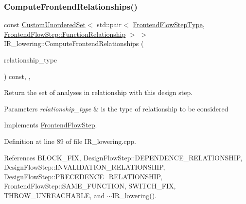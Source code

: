 \subsubsection{\texorpdfstring{Compute\+Frontend\+Relationships()}{ComputeFrontendRelationships()}}
{\footnotesize\ttfamily const \hyperlink{classCustomUnorderedSet}{Custom\+Unordered\+Set}$<$ std\+::pair$<$ \hyperlink{frontend__flow__step_8hpp_afeb3716c693d2b2e4ed3e6d04c3b63bb}{Frontend\+Flow\+Step\+Type}, \hyperlink{classFrontendFlowStep_af7cf30f2023e5b99e637dc2058289ab0}{Frontend\+Flow\+Step\+::\+Function\+Relationship} $>$ $>$ I\+R\+\_\+lowering\+::\+Compute\+Frontend\+Relationships (\begin{DoxyParamCaption}\item[{const \hyperlink{classDesignFlowStep_a723a3baf19ff2ceb77bc13e099d0b1b7}{Design\+Flow\+Step\+::\+Relationship\+Type}}]{relationship\+\_\+type }\end{DoxyParamCaption}) const\hspace{0.3cm}{\ttfamily [override]}, {\ttfamily [private]}, {\ttfamily [virtual]}}



Return the set of analyses in relationship with this design step. 


\begin{DoxyParams}{Parameters}
{\em relationship\+\_\+type} & is the type of relationship to be considered \\
\hline
\end{DoxyParams}


Implements \hyperlink{classFrontendFlowStep_abeaff70b59734e462d347ed343dd700d}{Frontend\+Flow\+Step}.



Definition at line 89 of file I\+R\+\_\+lowering.\+cpp.



References B\+L\+O\+C\+K\+\_\+\+F\+IX, Design\+Flow\+Step\+::\+D\+E\+P\+E\+N\+D\+E\+N\+C\+E\+\_\+\+R\+E\+L\+A\+T\+I\+O\+N\+S\+H\+IP, Design\+Flow\+Step\+::\+I\+N\+V\+A\+L\+I\+D\+A\+T\+I\+O\+N\+\_\+\+R\+E\+L\+A\+T\+I\+O\+N\+S\+H\+IP, Design\+Flow\+Step\+::\+P\+R\+E\+C\+E\+D\+E\+N\+C\+E\+\_\+\+R\+E\+L\+A\+T\+I\+O\+N\+S\+H\+IP, Frontend\+Flow\+Step\+::\+S\+A\+M\+E\+\_\+\+F\+U\+N\+C\+T\+I\+ON, S\+W\+I\+T\+C\+H\+\_\+\+F\+IX, T\+H\+R\+O\+W\+\_\+\+U\+N\+R\+E\+A\+C\+H\+A\+B\+LE, and $\sim$\+I\+R\+\_\+lowering().

